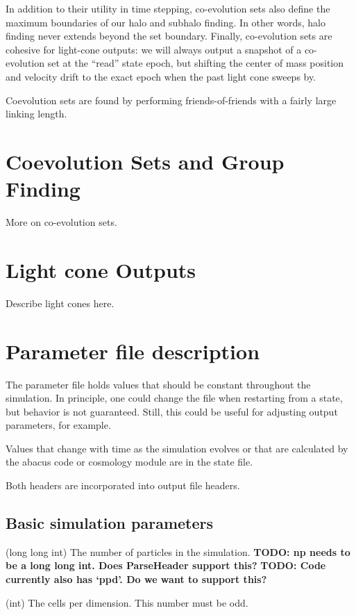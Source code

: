 \documentclass[11pt,preprint]{aastex}
\newcommand{\param}[2]{\medskip\noindent{\bf #1:} (#2) }
\newcommand{\todo}[1]{{\bf TODO: #1}}
\begin{document}
In addition to their utility in time stepping, co-evolution sets
also define the maximum boundaries of our halo and subhalo finding.
In other words, halo finding never extends beyond the set boundary.
Finally, co-evolution sets are cohesive for light-cone outputs: we
will always output a snapshot of a co-evolution set at the ``read''
state epoch, but shifting the center of mass position and velocity
drift to the exact epoch when the past light cone sweeps by.

Coevolution sets are found by performing friends-of-friends with a
fairly large linking length.

\section{Coevolution Sets and Group Finding}

More on co-evolution sets.

\section{Light cone Outputs}

Describe light cones here.


\section{Parameter file description}

The parameter file holds values that should be constant throughout the
simulation.  In principle, one could change the file when restarting
from a state, but behavior is not guaranteed.  Still, this could be
useful for adjusting output parameters, for example.

Values that change with time as the simulation evolves or that are 
calculated by the abacus code or cosmology module are in the state
file.

Both headers are incorporated into output file headers. 

\subsection{Basic simulation parameters}

\param{NP}{long long int} The number of particles in the simulation.
\todo{np needs to be a long long int.  Does ParseHeader support this?}
\todo{Code currently also has `ppd'.  Do we want to support this?}

\param{CPD}{int} The cells per dimension.  This number must be odd.
\end{document}
